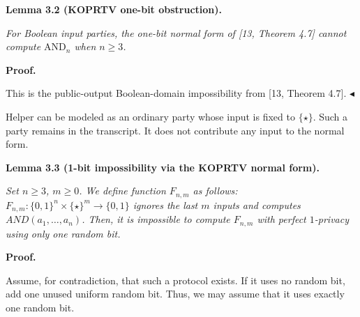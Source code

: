 \documentclass[10pt,a4paper]{article}
\begin{document}


\par\medskip\noindent\textbf{
\textbf{Lemma 3.2}\textbf{ }(KOPRTV one-bit obstruction)\textbf{.}
}\par



\emph{For Boolean input parties, the one-bit normal form of [13, Theorem 4.7] cannot compute $\mathrm{AND}_{n}$ when $n\geq 3$.}\par






\par\medskip\noindent\textbf{Proof.}\par




This is the public-output Boolean-domain impossibility from [13, Theorem 4.7].
$\blacktriangleleft$\par




Helper can be modeled as an ordinary party whose input is fixed to $\{\star\}$. Such a party remains in the transcript. It does not contribute any input to the normal form.\par





\par\medskip\noindent\textbf{
\textbf{Lemma 3.3}\textbf{ }(1-bit impossibility via the KOPRTV normal form)\textbf{.}
}\par



\emph{Set $n\geq 3$, $m\geq 0$. We define function $F_{n,m}$ as follows:
$F_{n,m}:\{0,1\}^{n}\times\{\star\}^{m}\to\{0,1\}$ ignores
the last $m$ inputs and computes $AND(a_{1},\ldots,a_{n})$.
Then, it is impossible to compute $F_{n,m}$ with perfect $1$-privacy using
only one random bit.}\par







\par\medskip\noindent\textbf{Proof.}\par




Assume, for contradiction, that such a protocol exists. If it uses no random
bit, add one unused uniform random bit. Thus, we may assume that it uses exactly
one random bit.\par
\end{document}
